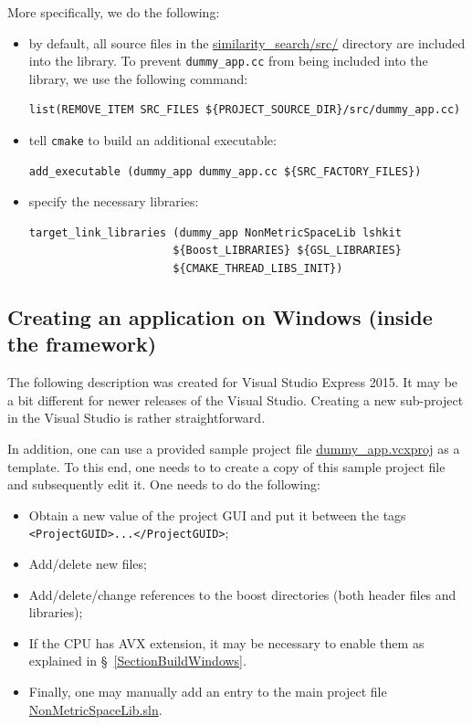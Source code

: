 \documentclass[runningheads,a4paper]{llncs}
\newcommand{\replocfile}{https://github.com/searchivarius/NonMetricSpaceLib/blob/pserv/}
\newcommand{\ttt}[1]{\texttt{#1}}
\begin{document}
More specifically, we do the following:
\begin{itemize}
\item by default, all source files in the  
\href{\replocfile similarity_search/src/}{similarity\_search/src/} directory are included into the library.
To prevent \ttt{dummy\_app.cc} from being included into the library, we use the following command:
\begin{verbatim}
list(REMOVE_ITEM SRC_FILES ${PROJECT_SOURCE_DIR}/src/dummy_app.cc)
\end{verbatim}

\item tell \ttt{cmake} to build an additional executable:
\begin{verbatim}
add_executable (dummy_app dummy_app.cc ${SRC_FACTORY_FILES})
\end{verbatim}

\item specify the necessary libraries:
\begin{verbatim}
target_link_libraries (dummy_app NonMetricSpaceLib lshkit 
                      ${Boost_LIBRARIES} ${GSL_LIBRARIES} 
                      ${CMAKE_THREAD_LIBS_INIT})
\end{verbatim}
\end{itemize}

\subsection{Creating an application on Windows (inside the framework)}\label{SectionCreateAppWindows}
The following description was created for Visual Studio Express 2015.
It may be a bit different for newer releases of the Visual Studio.
Creating a new sub-project in the Visual Studio is rather straightforward.

In addition, one can use a provided sample project file \href{\replocfile similarity_search/src/dummy_app.vcxproj}{dummy\_app.vcxproj} as a template.
To this end, one needs to to create a copy of this sample project file and subsequently edit it. 
One needs to do the following:
\begin{itemize}
\item Obtain a new value of the project GUI and put it between the tags \newline \ttt{<ProjectGUID>...</ProjectGUID>};
\item Add/delete new files; 
\item Add/delete/change references to the boost directories (both header files and libraries);
\item If the CPU has AVX extension, it may be necessary to enable them
as explained in \S~\ref{SectionBuildWindows}.
\item Finally, one may manually add an entry to the main project
file \href{\replocfile similarity_search/NonMetricSpaceLib.sln}{NonMetricSpaceLib.sln}.
\end{itemize}
\end{document}
